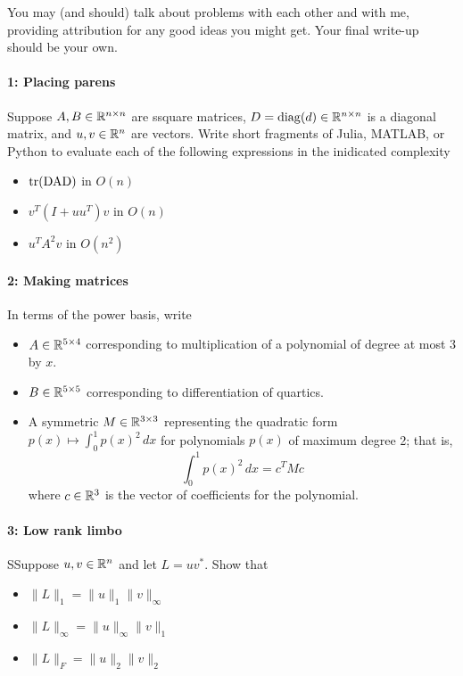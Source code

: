 \documentclass[12pt, leqno]{article} %
\begin{document}

You may (and should) talk about problems with each other and with me,
providing attribution for any good ideas you might get.  Your final
write-up should be your own.

\paragraph*{1: Placing parens}
Suppose $A, B \in \mathbb{R}^{n \times n}$ are ssquare matrices, $D =
\operatorname{diag}(d) \in \mathbb{R}^{n \times n}$ is a diagonal matrix,
and $u, v \in \mathbb{R}^n$ are vectors.  Write short fragments of Julia,
MATLAB, or Python to evaluate each of the following expressions in
the inidicated complexity
\begin{itemize}
\item $\operatorname{\operatorname{tr}(DAD)}$ in $O(n)$
\item $v^T (I+uu^T)v$ in $O(n)$
\item $u^T A^2 v$ in $O(n^2)$
\end{itemize}

\paragraph*{2: Making matrices}
In terms of the power basis, write
\begin{itemize}
\item $A \in \mathbb{R}^{5 \times 4}$ corresponding to multiplication of a
  polynomial of degree at most $3$ by $x$.
\item $B \in \mathbb{R}^{5 \times 5}$ corresponding to differentiation of quartics.
\item A symmetric $M \in \mathbb{R}^{3 \times 3}$ representing the quadratic
  form $p(x) \mapsto \int_0^1 p(x)^2 \, dx$ for polynomials $p(x)$ of
  maximum degree 2; that is,
  \[
    \int_0^1 p(x)^2 \, dx = c^T M c
  \]
  where $c \in \mathbb{R}^3$ is the vector of coefficients for the
  polynomial.
\end{itemize}

\paragraph*{3: Low rank limbo}
SSuppose $u, v \in \mathbb{R}^n$ and let $L = uv^*$.  Show that
\begin{itemize}
\item $\|L\|_1 = \|u\|_1 \|v\|_\infty$
\item $\|L\|_\infty = \|u\|_\infty \|v\|_1$
\item $\|L\|_F = \|u\|_2 \|v\|_2$
\end{itemize}
\end{document}
